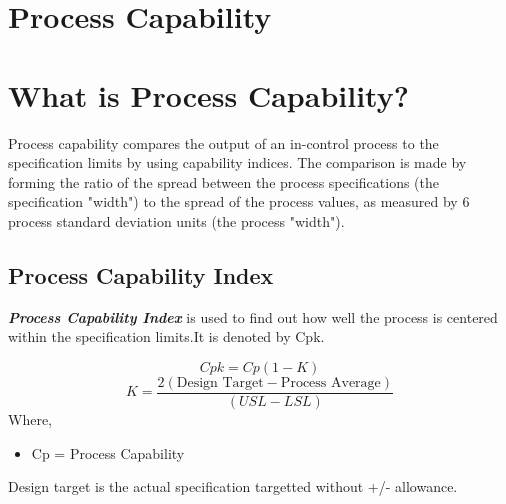 \documentclass[12pt]{article}
\begin{document}
\tableofcontents
\section{Process Capability}

\section{What is Process Capability?}

Process capability compares the output of an in-control process to the specification limits by using capability indices. The comparison is made by forming the ratio of the spread between the process specifications (the specification "width") to the spread of the process values, as measured by 6 process standard deviation units (the process "width").

\subsection{Process Capability Index}

\textit{\textbf{Process Capability Index}} is used to find out how well the process is centered within the specification limits.It is denoted by Cpk.

\[Cpk = Cp(1-K)\]
\[K = \frac{2(\mbox{Design Target} - \mbox{Process Average})}{ (USL - LSL)}
\]
Where,

\begin{itemize}
\item Cp = Process Capability
\end{itemize}

Design target is the actual specification targetted without +/- allowance.
\end{document}
